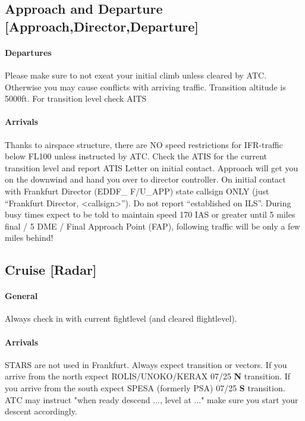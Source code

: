 \subsection[APP]{Approach and Departure [Approach,Director,Departure]}
\paragraph{Departures}
Please make sure to not exeat your initial climb unless cleared by ATC.
Otherwise you may cause conflicts with arriving traffic.
Transition altitude is 5000ft. For transition level check AITS

\paragraph{Arrivals}
Thanks to airspace structure, there are NO speed restrictions for IFR-traffic below FL100 unless
instructed by ATC.
Check the ATIS for the current transition level and report ATIS Letter on initial contact.
Approach will get you on the downwind and hand you over to director controller.
On initial contact with Frankfurt Director (EDDF\_ F/U\_APP) state callsign ONLY (just “Frankfurt Director, <callsign>”).
Do not report “established on ILS”. During busy times expect to be told to maintain speed 170 IAS or greater until 5 miles final / 5 DME / Final Approach Point (FAP), following traffic will be only a few miles behind! 

\subsection[CTR]{Cruise [Radar]}
\paragraph{General}
Always check in with current fightlevel (and cleared flightlevel).

\paragraph{Arrivals}
STARS are not used in Frankfurt. Always expect transition or vectors.
If you arrive from the north expect ROLIS/UNOKO/KERAX 07/25 \textbf{N} transition.
If you arrive from the south expect SPESA (formerly PSA) 07/25 \textbf{S} transition.
ATC may instruct "when ready descend ..., level at ..." make sure you start your descent accordingly.

